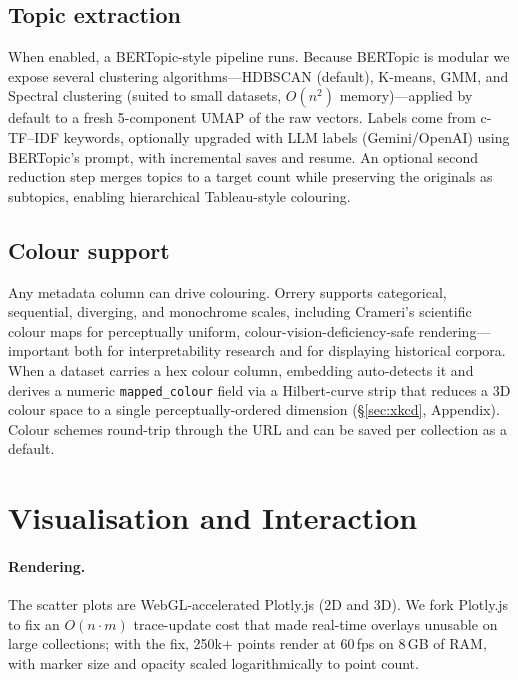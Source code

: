 \documentclass[11pt]{article}
\begin{document}
\subsection{Topic extraction}
\label{sec:topics}
When enabled, a BERTopic-style pipeline runs. Because BERTopic is modular
we expose several clustering algorithms---HDBSCAN (default), K-means, GMM,
and Spectral clustering (suited to small datasets, $O(n^2)$
memory)---applied by default to a fresh 5-component UMAP of the raw
vectors. Labels come from c-TF--IDF keywords, optionally upgraded with LLM
labels (Gemini/OpenAI) using BERTopic's prompt, with incremental saves and
resume. An optional second reduction step merges topics to a target count
while preserving the originals as subtopics, enabling hierarchical
Tableau-style colouring.

\subsection{Colour support}
\label{sec:colour}
Any metadata column can drive colouring. Orrery supports categorical,
sequential, diverging, and monochrome scales, including Crameri's
scientific colour maps \citep{crameri2020colourmaps} for perceptually
uniform, colour-vision-deficiency-safe rendering---important both for
interpretability research and for displaying historical corpora. When a
dataset carries a hex colour column, embedding auto-detects it and derives
a numeric \texttt{mapped\_colour} field via a Hilbert-curve strip that
reduces a 3D colour space to a single perceptually-ordered dimension
(\S\ref{sec:xkcd}, Appendix). Colour schemes round-trip through the URL and
can be saved per collection as a default.

\section{Visualisation and Interaction}
\label{sec:viz}

\paragraph{Rendering.} The scatter plots are WebGL-accelerated Plotly.js
(2D and 3D). We fork Plotly.js to fix an $O(n\cdot m)$ trace-update cost
that made real-time overlays unusable on large collections; with the fix,
250k+ points render at 60\,fps on 8\,GB of RAM, with marker size and
opacity scaled logarithmically to point count.
\end{document}
